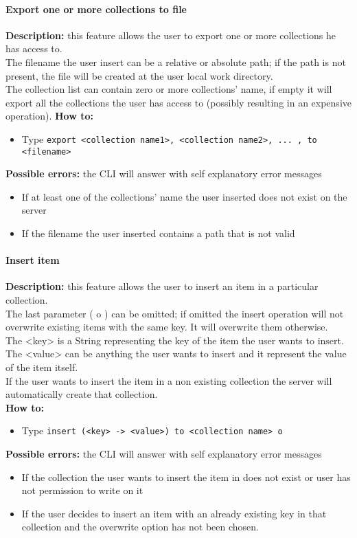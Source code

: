\documentclass{scalatekids-article}
\begin{document}
\paragraph{Export one or more collections to file}
\label{sec:export}
\textbf{Description:} this feature allows the user to export one or more collections he has access to.\\
The filename the user insert can be a relative or absolute path; if the path is not present, the file will be created at the user local work directory.\\
The collection list can contain zero or more collections' name, if empty it will export all the collections the user has access to (possibly resulting in an expensive operation).
\textbf{How to:} 
\begin{itemize}
	\item Type \texttt{export <collection name1>, <collection name2>, ... , to <filename>}
\end{itemize}
\textbf{Possible errors:} the CLI will answer with self explanatory error messages 
\begin{itemize}
	\item If at least one of the collections' name the user inserted does not exist on the server
	\item If the filename the user inserted contains a path that is not valid
\end{itemize}

\paragraph{Insert item}
\label{sec:insertitem}
\textbf{Description:} this feature allows the user to insert an item in a particular collection.\\
The last parameter ( o ) can be omitted; if omitted the insert operation will not overwrite existing items with the same key. It will overwrite them otherwise. \\
The <key> is a String representing the key of the item the user wants to insert.\\
The <value> can be anything the user wants to insert and it represent the value of the item itself.\\
If the user wants to insert the item in a non existing collection the server 
will automatically create that collection.\\
\textbf{How to:} 
\begin{itemize}
	\item Type \texttt{insert (<key> -> <value>) to <collection name> o}
\end{itemize}
\textbf{Possible errors:} the CLI will answer with self explanatory error messages 
\begin{itemize}
	\item If the collection the user wants to insert the item in does not exist or user has not permission to write on it
	\item If the user decides to insert an item with an already existing key in that collection and the overwrite option has not been chosen.  
\end{itemize}
\end{document}
